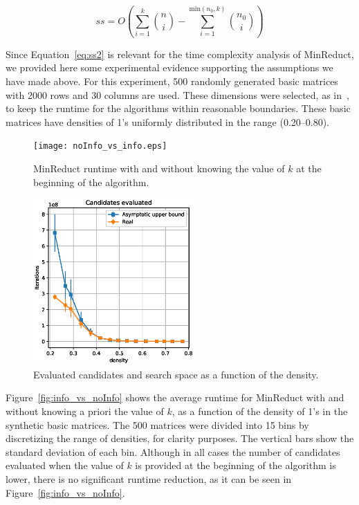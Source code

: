 \documentclass[citenumber]{llncs}
\begin{document}
	\begin{equation}
	ss = O\left(\sum_{i=1}^{k} \binom{n}{i} - \sum_{i=1}^{\mathrm{min}(n_0,k)} \binom{n_0}{i}\right)\label{eq:ss2}
	\end{equation}
	
	Since Equation~\ref{eq:ss2} is relevant for the time complexity analysis of MinReduct, we provided here some experimental evidence supporting the assumptions we have made above. For this experiment, 500 randomly generated basic matrices with 2000 rows and 30 columns are used. These dimensions were  selected, as in~\cite{Rodriguez2018}, to keep the runtime for the algorithms within reasonable boundaries. These basic matrices have densities of 1's uniformly distributed in the range (0.20--0.80). 
	
	\begin{figure}[hbt] 
		\begin{minipage}[t]{.48\linewidth}
			\begin{center}
				\texttt{[image: noInfo\_vs\_info.eps]}
			\end{center}
			\caption{MinReduct runtime with and without knowing the value of $k$ at the beginning of the algorithm.}\label{fig:info_vs_noInfo}
		\end{minipage}
		\begin{minipage}[t]{.48\linewidth}
			\begin{center}
				\includegraphics[height=2.5in]{Candidates_vs_SearchSpace.eps}
			\end{center}
			\caption{Evaluated candidates and search space as a function of the density.}\label{fig:candidates}
		\end{minipage}
	\end{figure}
	
	Figure~\ref{fig:info_vs_noInfo} shows the average runtime for MinReduct with and without knowing a priori the value of $k$, as a function of the density of 1's in the synthetic basic matrices. The 500 matrices were divided into 15 bins by discretizing the range of densities, for clarity purposes. The vertical bars show the standard deviation of each bin. Although in all cases the number of candidates evaluated when the value of $k$ is provided at the beginning of the algorithm is lower, there is no significant runtime reduction, as it can be seen in Figure~\ref{fig:info_vs_noInfo}. 
	
\end{document}
